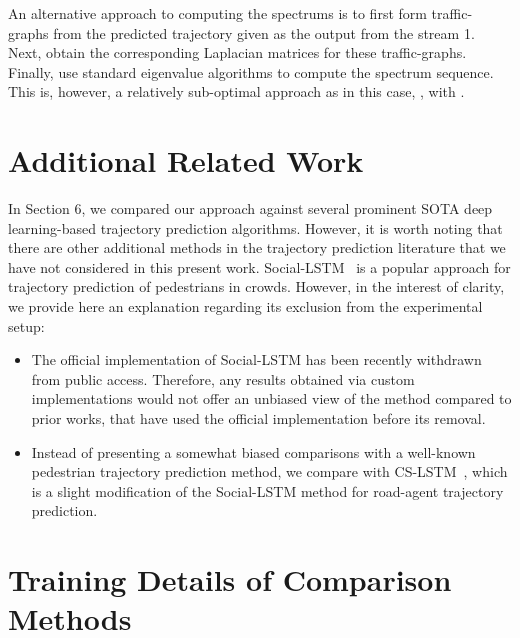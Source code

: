 \documentclass[10pt,twocolumn,letterpaper]{article}
\theoremstyle{plain}
\begin{document}
An alternative approach to computing the spectrums  is to first form traffic-graphs from the predicted trajectory given as the output from the stream 1. Next, obtain the corresponding Laplacian matrices for these traffic-graphs. Finally, use standard eigenvalue algorithms to compute the spectrum sequence. This is, however, a relatively sub-optimal approach as in this case, , with .

\section{Additional Related Work}

In Section 6, we compared our approach against several prominent SOTA deep learning-based trajectory prediction algorithms. However, it is worth noting that there are other additional methods in the trajectory prediction literature that we have not considered in this present work. Social-LSTM~\cite{social-lstm} is a popular approach for trajectory prediction of pedestrians in crowds. However, in the interest of clarity, we provide here an explanation regarding its exclusion from the experimental setup:

\begin{itemize}
    \item The official implementation of Social-LSTM has been recently withdrawn from public access. Therefore, any results obtained via custom implementations would not offer an unbiased view of the method compared to prior works, that have used the official implementation before its removal.
    
    \item Instead of presenting a somewhat biased comparisons with a well-known pedestrian trajectory prediction method, we compare with CS-LSTM~\cite{nachiket}, which is a slight modification of the Social-LSTM method for road-agent trajectory prediction.
\end{itemize}


\section{Training Details of Comparison Methods}
\end{document}
